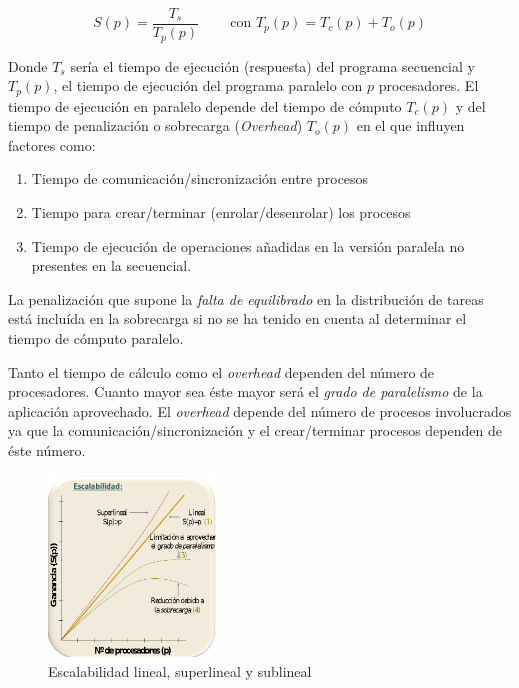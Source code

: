 \documentclass[10pt,a4paper,spanish]{report}
\begin{document}
\begin{displaymath}
S(p) = \frac{T_s}{T_p(p)} \qquad\ \textrm{con $T_p(p) = T_c(p) + T_o(p)$}
\end{displaymath}

Donde $T_s$ sería el tiempo de ejecución (respuesta) del programa secuencial y $T_p(p)$, el tiempo de ejecución del programa paralelo con $p$ procesadores. El tiempo de ejecución en paralelo depende del tiempo de cómputo $T_c(p)$ y del tiempo de penalización o sobrecarga (\textit{\textcolor[rgb]{0.2,0.4,0.8}{Overhead}}) $T_o(p)$ en el que influyen factores como:
\begin{enumerate}[\color{azul}{\bf $\heartsuit$}]
    \item Tiempo de comunicación/sincronización entre procesos
    \item Tiempo para crear/terminar (enrolar/desenrolar) los procesos
    \item Tiempo de ejecución de operaciones añadidas en la versión paralela no presentes en la secuencial.
\end{enumerate}

La penalización que supone la \textcolor[rgb]{0.2,0.4,0.8}{\textit{falta de equilibrado}} en la distribución de tareas está incluída en la sobrecarga si no se ha tenido en cuenta al determinar el tiempo de cómputo paralelo.

Tanto el tiempo de cálculo como el \textcolor[rgb]{0.2,0.4,0.8}{\textit{overhead}} dependen del número de procesadores. Cuanto mayor sea éste mayor será el \textcolor[rgb]{0.2,0.4,0.8}{\textit{grado de paralelismo}} de la aplicación aprovechado. El \textcolor[rgb]{0.2,0.4,0.8}{\textit{overhead}} depende del número de procesos involucrados ya que la comunicación/sincronización y el crear/terminar procesos dependen de éste número. 

\begin{figure}[!h]
\centering
\includegraphics[width=0.4\textwidth]{48}
\caption{Escalabilidad lineal, superlineal y sublineal}
\label{grafica_lineal}
\end{figure}
\end{document}
